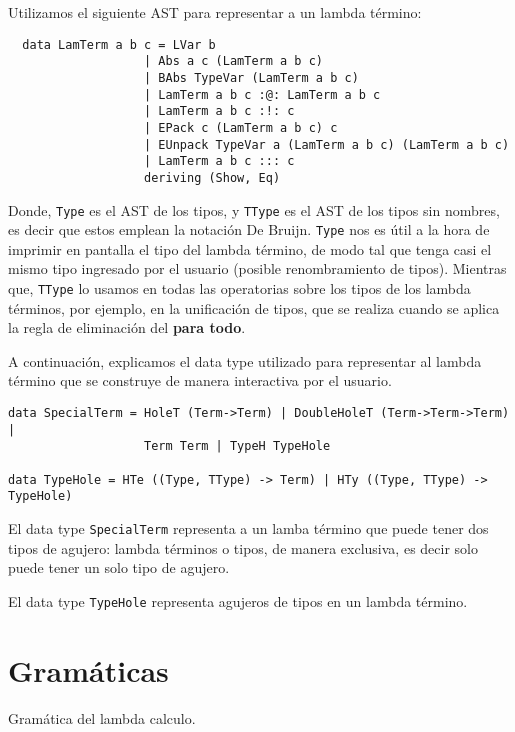 \documentclass[a4paper,11pt]{article}
\begin{document}
Utilizamos el siguiente AST para representar a un lambda término:
\begin{verbatim}
  data LamTerm a b c = LVar b
                   | Abs a c (LamTerm a b c)
                   | BAbs TypeVar (LamTerm a b c)
                   | LamTerm a b c :@: LamTerm a b c
                   | LamTerm a b c :!: c
                   | EPack c (LamTerm a b c) c
                   | EUnpack TypeVar a (LamTerm a b c) (LamTerm a b c)
                   | LamTerm a b c ::: c
                   deriving (Show, Eq)
\end{verbatim}
  
Donde, \texttt{Type} es el AST de los tipos, y \texttt{TType} es el AST de los tipos sin nombres, es decir que estos emplean la notación De Bruijn.
\texttt{Type} nos es útil a la hora de imprimir en pantalla el tipo del lambda término, de modo tal que tenga casi el mismo tipo ingresado por el usuario 
(posible renombramiento de tipos).
Mientras que, \texttt{TType} lo usamos en todas las operatorias sobre los tipos de los lambda términos, por ejemplo, en la unificación de tipos, que
se realiza cuando se aplica la regla de eliminación del \textbf{para todo}.

A continuación, explicamos el data type utilizado para representar al lambda término que se construye de manera interactiva por el usuario.

\begin{verbatim}
data SpecialTerm = HoleT (Term->Term) | DoubleHoleT (Term->Term->Term) |
                   Term Term | TypeH TypeHole

data TypeHole = HTe ((Type, TType) -> Term) | HTy ((Type, TType) -> TypeHole)
\end{verbatim}

El data type \texttt{SpecialTerm} representa a un lamba término que puede tener dos tipos de agujero: lambda términos o tipos, de manera
exclusiva, es decir solo puede tener un solo tipo de agujero.

El data type \texttt{TypeHole} representa agujeros de tipos en un lambda término.

\section{Gramáticas}
 Gramática del lambda calculo.
\end{document}

